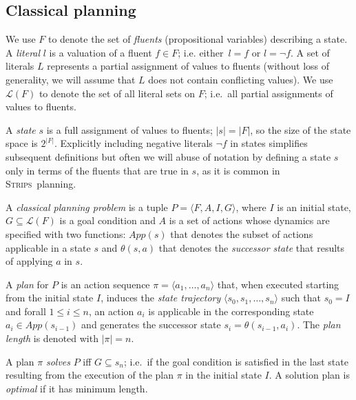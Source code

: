 \documentclass[letterpaper]{article} %
\newcommand{\tup}[1]{{\langle #1 \rangle}}
\newcommand{\strips}{\textsc{Strips}}     %
\begin{document}
\subsection{Classical planning}
We use $F$ to denote the set of {\em fluents} (propositional variables) describing a state. A {\em literal} $l$ is a valuation of a fluent $f\in F$; i.e. either~$l=f$ or $l=\neg f$. A set of literals $L$ represents a partial assignment of values to fluents (without loss of generality, we will assume that $L$ does not contain conflicting values). We use $\mathcal{L}(F)$ to denote the set of all literal sets on $F$; i.e.~all partial assignments of values to fluents.

A {\em state} $s$ is a full assignment of values to fluents; $|s|=|F|$, so the size of the state space is $2^{|F|}$. Explicitly including negative literals $\neg f$ in states simplifies subsequent definitions but often we will abuse of notation by defining a state $s$ only in terms of the fluents that are true in $s$, as it is common in \strips\ planning.

A {\em classical planning problem} is a tuple $P=\tup{F,A,I,G}$, where $I$ is an initial state, $G\subseteq\mathcal{L}(F)$ is a goal condition and $A$ is a set of actions whose dynamics are specified with two functions: $App(s)$ that denotes the subset of actions applicable in a state $s$ and $\theta(s,a)$ that denotes the {\em successor state} that results of applying $a$ in $s$.

A {\em plan} for $P$ is an action sequence $\pi=\tup{a_1, \ldots, a_n}$ that, when executed starting from the initial state $I$, induces the {\em state trajectory} $\tup{s_0, s_1, \ldots, s_n}$ such that $s_0=I$ and forall {\small $1\leq i\leq n$}, an action $a_i$ is applicable in the corresponding state $a_i\in App(s_{i-1})$ and  generates the successor state $s_i=\theta(s_{i-1},a_i)$. The {\em plan length} is denoted with $|\pi|=n$.

A plan $\pi$ {\em solves} $P$ iff $G\subseteq s_n$; i.e.~if the goal condition is satisfied in the last state resulting from the execution of the plan $\pi$ in the initial state $I$. A solution plan is {\em optimal} if it has minimum length.
\end{document}
